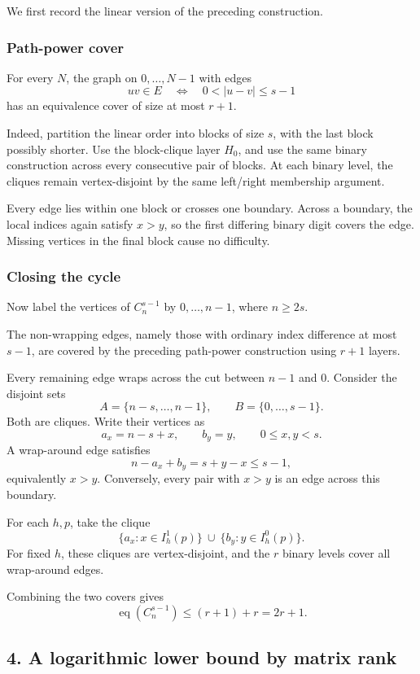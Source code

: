 \documentclass[
  11pt,
  a4paper,
]{article}
\begin{document}
We first record the linear version of the preceding construction.

\subsubsection{Path-power cover}\label{path-power-cover}

For every \(N\), the graph on \(0,\dots,N-1\) with edges \[
uv\in E\quad\Longleftrightarrow\quad 0<|u-v|\le s-1
\] has an equivalence cover of size at most \(r+1\).

Indeed, partition the linear order into blocks of size \(s\), with the
last block possibly shorter. Use the block-clique layer \(H_0\), and use
the same binary construction across every consecutive pair of blocks. At
each binary level, the cliques remain vertex-disjoint by the same
left/right membership argument.

Every edge lies within one block or crosses one boundary. Across a
boundary, the local indices again satisfy \(x>y\), so the first
differing binary digit covers the edge. Missing vertices in the final
block cause no difficulty.

\subsubsection{Closing the cycle}\label{closing-the-cycle}

Now label the vertices of \(C_n^{s-1}\) by \(0,\dots,n-1\), where
\(n\ge2s\).

The non-wrapping edges, namely those with ordinary index difference at
most \(s-1\), are covered by the preceding path-power construction using
\(r+1\) layers.

Every remaining edge wraps across the cut between \(n-1\) and \(0\).
Consider the disjoint sets \[
A=\{n-s,\dots,n-1\},\qquad
B=\{0,\dots,s-1\}.
\] Both are cliques. Write their vertices as \[
a_x=n-s+x,\qquad b_y=y,
\qquad 0\le x,y<s.
\] A wrap-around edge satisfies \[
n-a_x+b_y=s+y-x\le s-1,
\] equivalently \(x>y\). Conversely, every pair with \(x>y\) is an edge
across this boundary.

For each \(h,p\), take the clique \[
\{a_x:x\in I_h^1(p)\}
\ \cup\
\{b_y:y\in I_h^0(p)\}.
\] For fixed \(h\), these cliques are vertex-disjoint, and the \(r\)
binary levels cover all wrap-around edges.

Combining the two covers gives \[
\operatorname{eq}(C_n^{s-1})
\le (r+1)+r=2r+1.
\]

\subsection{4. A logarithmic lower bound by matrix
rank}\label{a-logarithmic-lower-bound-by-matrix-rank}
\end{document}
